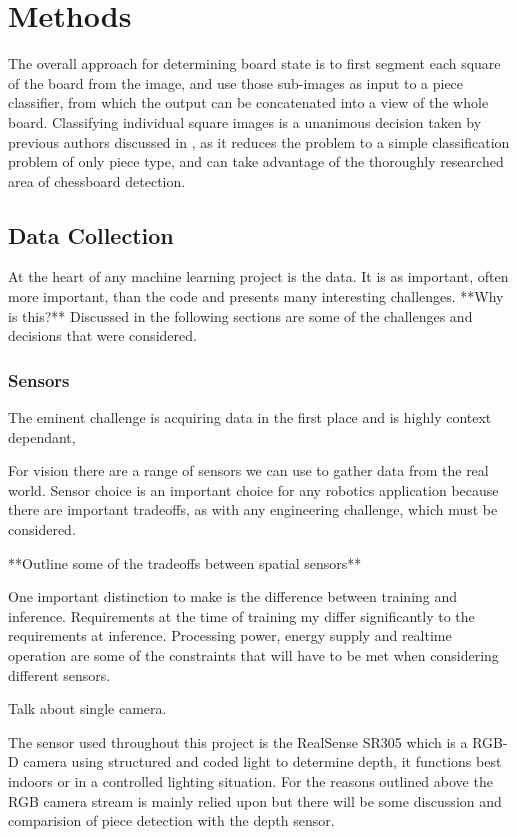 \chapter{Methods}
\label{methods}

The overall approach for determining board state is to first segment each square of the board from the image,
and use those sub-images as input to a piece classifier, from which the output can be concatenated into a view of the whole board.
Classifying individual square images is a unanimous decision taken by previous authors discussed in ,
as it reduces the problem to a simple classification problem of only piece type, and can take advantage of the thoroughly researched area 
of chessboard detection.

\section{Data Collection}
\label{data collection}
At the heart of any machine learning project is the data.  
It is as important, often more important, than the code and presents many interesting
challenges.  **Why is this?**
Discussed in the following sections are some of the challenges and decisions that were considered.

\subsection{Sensors}
The eminent challenge is acquiring data in the first place and is highly context dependant,

For vision there are a range of sensors we can use to gather data from the real world.
Sensor choice is an important choice for any robotics application because there are 
important tradeoffs, as with any engineering challenge, which must be considered.

**Outline some of the tradeoffs between spatial sensors**

One important distinction to make is the difference between training and inference.
Requirements at the time of training my differ significantly to the requirements at 
inference.  Processing power, energy supply and realtime operation are some
of the constraints that will have to be met when considering different sensors.

Talk about single camera. 

The sensor used throughout this project is the RealSense SR305 which is a RGB-D camera
using structured and coded light to determine depth, it functions best indoors or in a 
controlled lighting situation.  For the reasons outlined above the RGB camera stream is 
mainly relied upon but there will be some discussion and comparision of piece detection 
with the depth sensor.  


